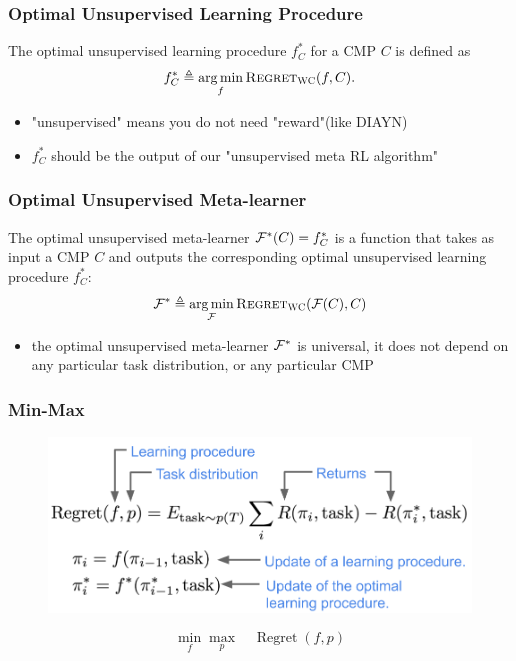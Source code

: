 \documentclass[aspectratio=169]{beamer}
\begin{document}
\begin{frame}
  \frametitle{Optimal Unsupervised Learning Procedure}

  \begin{definition}
    The optimal unsupervised learning procedure $f_C^*$ for a CMP $C$ is defined as
    \begin{equation*}
    \vspace{-1em}
        f_C^* \triangleq \argmin_f \textsc{Regret}_{\textsc{WC}}(f, C).
    \end{equation*}
    \end{definition}
    \begin{itemize}
      \item "unsupervised" means you do not need "reward"(like DIAYN)
      \item $f_C^*$ should be the output of our "unsupervised meta RL algorithm"
    \end{itemize}
\end{frame}

\begin{frame}
  \frametitle{Optimal Unsupervised Meta-learner}

   \begin{definition}
  The optimal unsupervised meta-learner ${\mathcal{F}}^*(C) = f_C^*$ is a function that takes as input a CMP $C$ and outputs the corresponding optimal unsupervised learning procedure $f_C^*$:
  \begin{equation*}
  \vspace{-1em}
      \gF^* \triangleq \argmin_{\gF} \textsc{Regret}_{\textsc{WC}}(\gF(C), C)
  \end{equation*}
  \end{definition}
  
  \begin{itemize}
    \item the optimal unsupervised meta-learner ${\mathcal{F}}^*$ is universal, it does not depend on any particular task distribution, or any particular CMP
  \end{itemize}
\end{frame}

\begin{frame}
  \frametitle{Min-Max}
  \begin{figure}
  \centering
  \includegraphics[width=0.7\linewidth]{imgs/labeled_regret_v2.png}
  \end{figure}

  $$\min _{f} \max _{p} \quad \operatorname{Regret}(f, p)$$
\end{frame}
\end{document}
